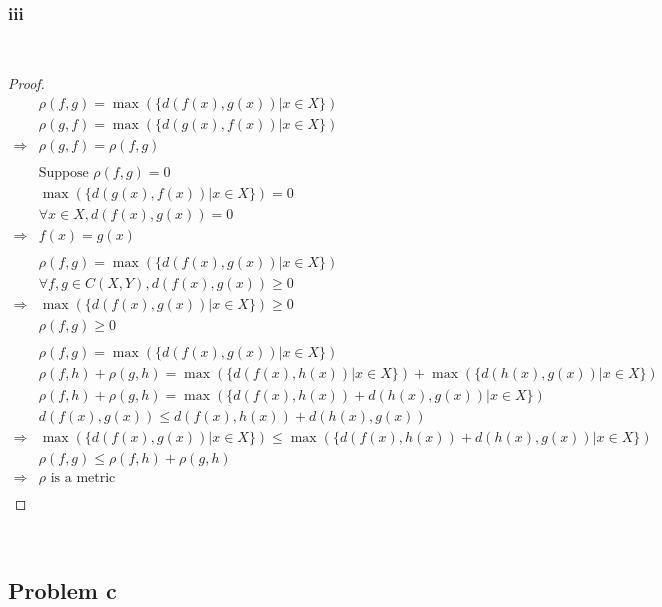 \documentclass{article}
\begin{document}
~

\subsubsection*{iii}

~

\begin{proof}
    \begin{align*}
        &\rho(f,g)=\max(\{d(f(x),g(x))|x\in X\})\\
        &\rho(g,f)=\max(\{d(g(x),f(x))|x\in X\})\\
        \Rightarrow&\rho(g,f)=\rho(f,g)\\
        &\\
        &\text{Suppose }\rho(f,g)=0\\
        &\max(\{d(g(x),f(x))|x\in X\})=0\\
        &\forall x\in X,d(f(x),g(x))=0\\
        \Rightarrow&f(x)=g(x)\\
        &\\
        &\rho(f,g)=\max(\{d(f(x),g(x))|x\in X\})\\
        &\forall f,g\in C(X,Y),d(f(x),g(x))\geqslant 0\\
        \Rightarrow&\max(\{d(f(x),g(x))|x\in X\})\geqslant 0\\
        &\rho(f,g)\geqslant 0\\
        &\\
        &\rho(f,g)=\max(\{d(f(x),g(x))|x\in X\})\\
        &\rho(f,h)+\rho(g,h)=\max(\{d(f(x),h(x))|x\in X\})+\max(\{d(h(x),g(x))|x\in X\})\\
        &\rho(f,h)+\rho(g,h)=\max(\{d(f(x),h(x))+d(h(x),g(x))|x\in X\})\\
        &d(f(x),g(x))\leqslant d(f(x),h(x))+d(h(x),g(x))\\
        \Rightarrow&\max(\{d(f(x),g(x))|x\in X\})\leqslant\max(\{d(f(x),h(x))+d(h(x),g(x))|x\in X\})\\
        &\rho(f,g)\leqslant\rho(f,h)+\rho(g,h)\\
        \Rightarrow&\rho\text{ is a metric}\\
    \end{align*}
\end{proof}

~

\subsection*{Problem c}
\end{document}
